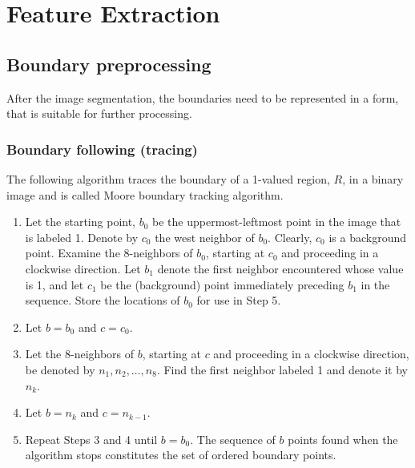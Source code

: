 \section{Feature Extraction}
\label{sec:featureExtraction}
\subsection{Boundary preprocessing}
After the image segmentation, the boundaries need to be represented in a form, that is suitable for further processing.
\subsubsection{Boundary following (tracing)}
The following algorithm traces the boundary of a 1-valued region, $R$, in a binary image and is called Moore boundary tracking algorithm.
\begin{enumerate}
\item Let the starting point, $b_0$ be the uppermost-leftmost point in the image that is labeled 1. Denote by $c_0$ the west neighbor of $b_0$. Clearly, $c_0$ is a background point. Examine the 8-neighbors of $b_0$, starting at $c_0$ and proceeding in a clockwise direction. Let $b_1$ denote the first neighbor encountered whose value is 1, and let $c_1$ be the (background) point immediately preceding $b_1$ in the sequence. Store the locations of $b_0$ for use in Step 5.
\item Let $b=b_0$ and $c=c_0$.
\item Let the 8-neighbors of $b$, starting at $c$ and proceeding in a clockwise direction, be denoted by $n_1,n_2,\ldots,n_8$. Find the first neighbor labeled 1 and denote it by $n_k$.
\item Let $b=n_k$ and $c=n_{k-1}$.
\item Repeat Steps 3 and 4 until $b=b_0$. The sequence of $b$ points found when the algorithm stops constitutes the set of ordered boundary points.
\end{enumerate}
